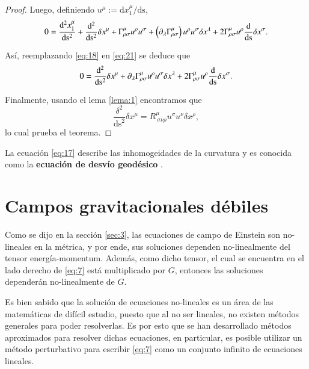 \begin{proof}
Luego, definiendo $u^{\mu} := \mathrm{d} x^{\mu}_1 / \mathrm{ds}$,
\begin{equation}
\label{eq:21}
0 = \dv[2]{x_1^{\mu}}{\mathrm{s}} + \dv[2]{ }{\mathrm{s}} \delta x^{\mu} + \Gamma^{\mu}_{\rho \sigma} u^{\rho} u^{\sigma} + \left( \partial_{\lambda} \Gamma^{\mu}_{\rho \sigma} \right) u^{\rho} u^{\sigma} \delta x^{\lambda} + 2 \Gamma^{\mu}_{\rho \sigma} u^{\rho} \dv{ }{\mathrm{s}} \delta x^{\sigma}. 
\end{equation}

Así, reemplazando \eqref{eq:18} en \eqref{eq:21} se deduce que
\begin{equation}
0 = \dv[2]{ }{\mathrm{s}} \delta x^{\mu} + \partial_{\lambda} \Gamma^{\mu}_{\rho \sigma} u^{\rho} u^{\sigma} \delta x^{\lambda} + 2 \Gamma^{\mu}_{\rho \sigma} u^{\rho} \dv{ }{\mathrm{s}} \delta x^{\sigma}.
\end{equation}

Finalmente, usando el lema \ref{lema:1} encontramos que
\begin{equation}
\frac{\delta^2}{\mathrm{ds}^2}\delta x^{\mu} = R^{\mu}_{\ \sigma \nu \rho} u^{\sigma} u^{\nu} \delta x^{\rho},
\end{equation}
lo cual prueba el teorema.
\end{proof}

La ecuación \eqref{eq:17} describe las inhomogeidades de la curvatura y es conocida como la \textbf{ecuación de desvío geodésico} \cite{Ciufolini}.

\section{Campos gravitacionales débiles}

Como se dijo en la sección \ref{sec:3}, las ecuaciones de campo de Einstein son no-lineales en la métrica, y por ende, sus soluciones dependen no-linealmente del tensor energía-momentum. Además, como dicho tensor, el cual se encuentra en el lado derecho de \eqref{eq:7} está multiplicado por $G$, entonces las soluciones dependerán no-linealmente de $G$.

Es bien sabido que la solución de ecuaciones no-lineales es un área de las matemáticas de difícil estudio, puesto que al no ser lineales, no existen métodos generales para poder resolverlas. Es por esto que se han desarrollado métodos aproximados para resolver dichas ecuaciones, en particular, es posible utilizar un método perturbativo para escribir \eqref{eq:7} como un conjunto infinito de ecuaciones lineales.

